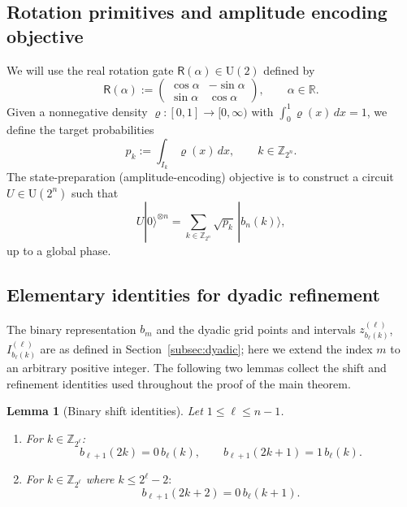 \documentclass{article}
\newtheorem{lemma}[theorem]{Lemma}
\newcommand{\rR}{\mathsf{R}}
\numberwithin{equation}{section}
\begin{document}
\subsection{Rotation primitives and amplitude encoding objective}\label{subsec:rotations}

We will use the real rotation gate $\rR(\alpha)\in\mathrm{U}(2)$ defined by
\[
\rR(\alpha):=
\begin{pmatrix}
\cos\alpha & -\sin\alpha\\
\sin\alpha & \cos\alpha
\end{pmatrix},
\qquad \alpha\in\mathbb{R}.
\]
Given a nonnegative density $\varrho:[0,1]\to[0,\infty)$ with $\int_0^1\varrho(x)\,dx=1$,
we define the target probabilities
\[
p_k:=\int_{I_k}\varrho(x)\,dx,\qquad k\in\mathbb{Z}_{2^n}.
\]
The state-preparation (amplitude-encoding) objective is to construct a circuit $U\in\mathrm{U}(2^n)$
such that
\[
U|0\rangle^{\otimes n}=\sum_{k\in\mathbb{Z}_{2^n}}\sqrt{p_k}\,|b_n(k)\rangle,
\]
up to a global phase.

\subsection{Elementary identities for dyadic refinement}\label{subsec:binary-dyadic}

The binary representation $b_m$ and the dyadic grid points and intervals
$z^{(\ell)}_{b_\ell(k)}$, $I^{(\ell)}_{b_\ell(k)}$ are as defined in
Section~\ref{subsec:dyadic}; here we extend the index $m$ to an arbitrary positive integer.
The following two lemmas collect the shift and refinement identities used
throughout the proof of the main theorem.

\begin{lemma}[Binary shift identities]\label{lem:binary-shift}
Let $1\le \ell\le n-1$.
\begin{enumerate}
\item[\rm(i)] For $k\in \mathbb{Z}_{2^{\ell}}$:
\[
b_{\ell+1}(2k)=0\,b_\ell(k),\qquad
b_{\ell+1}(2k+1)=1\,b_\ell(k).
\]
\item[\rm(ii)] For $k\in \mathbb{Z}_{2^{\ell}}$ where $k \le 2^{\ell}-2:$
\[
b_{\ell+1}(2k+2)=0\,b_\ell(k+1).
\]
\end{enumerate}
\end{lemma}
\end{document}
